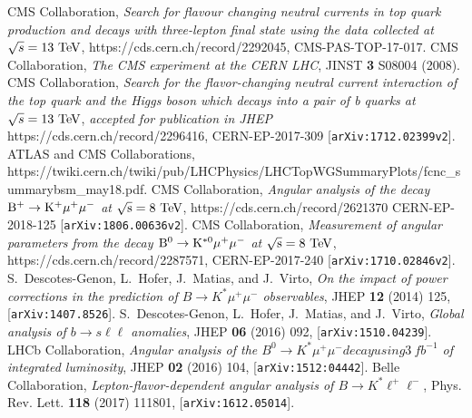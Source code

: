 \documentclass{PoS}
\begin{document}
\clearpage
\begin{thebibliography}{99}

  CMS Collaboration,
  \emph{Search for flavour changing neutral currents in top quark production and decays with three-lepton final state using the data collected at $\sqrt{s} = 13~{\rm TeV}$},
  https://cds.cern.ch/record/2292045, CMS-PAS-TOP-17-017.
  CMS Collaboration,
  \emph{The CMS experiment at the CERN LHC},
  JINST {\bf 3} S08004 (2008).
  CMS Collaboration,
  \emph{Search for the flavor-changing neutral current interaction of the top quark and the Higgs boson which decays into a pair of b quarks at $\sqrt{s} = 13~{\rm TeV}$},
  \emph{accepted for publication in JHEP}
  https://cds.cern.ch/record/2296416, CERN-EP-2017-309
  [{\tt arXiv:1712.02399v2}].
  ATLAS and CMS Collaborations,
  https://twiki.cern.ch/twiki/pub/LHCPhysics/LHCTopWGSummaryPlots/fcnc\_summarybsm\_may18.pdf.
  CMS Collaboration,
  \emph{Angular analysis of the decay ${\rm B^+ \to K^+\mu^+\mu^-}$ at ${\rm \sqrt{s} = 8~TeV}$},
  https://cds.cern.ch/record/2621370 CERN-EP-2018-125
  [{\tt arXiv:1806.00636v2}].
  CMS Collaboration,
  \emph{Measurement of angular parameters from the decay ${\rm B^0 \to K^{*0}\mu^+\mu^-}$ at ${\rm \sqrt{s} = 8~TeV}$},
  https://cds.cern.ch/record/2287571, CERN-EP-2017-240
  [{\tt arXiv:1710.02846v2}].  
  S.~Descotes-Genon, L.~Hofer, J.~Matias, and J.~Virto,
  \emph{On the impact of power corrections in the prediction of $B \to K^*\mu^+\mu^-$ observables},
  JHEP {\bf 12} (2014) 125, [{\tt arXiv:1407.8526}].
  S.~Descotes-Genon, L.~Hofer, J.~Matias, and J.~Virto,
  \emph{Global analysis of $b \to s\ell\ell$ anomalies},
  JHEP {\bf 06} (2016) 092, [{\tt arXiv:1510.04239}].
  LHCb Collaboration,
  \emph{Angular analysis of the $B^0 \to K^*\mu^+\mu^- decay using 3~fb^{-1}$ of integrated luminosity},
  JHEP {\bf 02} (2016) 104, [{\tt arXiv:1512:04442}].
  Belle Collaboration,
  \emph{Lepton-flavor-dependent angular analysis of $B \to K^* \ell^+\ell^-$},
  Phys. Rev. Lett. {\bf 118} (2017) 111801, [{\tt arXiv:1612.05014}].
\end{thebibliography}
\end{document}

